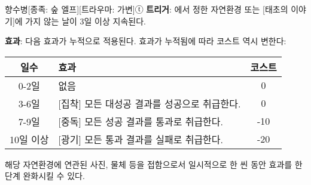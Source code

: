 \documentclass{report}
\begin{document}
	\begin{story}{향수병}{[종족: 숲 엘프][트라우마: 가변]ⓣ}
		\textbf{트리거}: 에서 정한 자연환경 또는 [태초의 이야기]에 가지 않는 날이 3일 이상 지속된다.
		
		\textbf{효과}: 다음 효과가 누적으로 적용된다. 효과가 누적됨에 따라 코스트 역시 변한다:
		\begin{center}
			\begin{tabular}{c|l|c}
				\textbf{일수}      & \textbf{효과}                                & \textbf{코스트}\\\hline\hline
				0-2일              & 없음                                         & 0              \\\hline
				3-6일              & [집착] 모든 대성공 결과를 성공으로 취급한다. & 0              \\\hline
				7-9일              & [중독] 모든 성공 결과를 통과로 취급한다.     & -10            \\\hline
				10일 이상          & [광기] 모든 통과 결과를 실패로 취급한다.     & -20            \\
			\end{tabular}
		\end{center}
		
		해당 자연환경에 연관된 사진, 물체 등을 접함으로서 일시적으로 한 씬 동안 효과를 한 단계 완화시킬 수 있다.
	\end{story}
\end{document}
